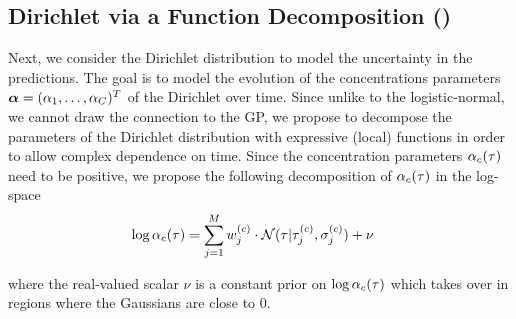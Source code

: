 \subsection{Dirichlet via a Function Decomposition (\DirModel)}
\label{dirichlet}

Next, we consider the Dirichlet distribution to model the uncertainty in the predictions. The goal is to model the evolution of the concentrations parameters $\bm{\alpha}=(\alpha_1, \dots,\alpha_C)^T$ of the Dirichlet over time. 
Since unlike to the logistic-normal, we cannot draw the connection to the GP, we propose  to decompose the parameters of the Dirichlet distribution with expressive (local) functions in order to allow complex dependence on time. 
Since the concentration parameters $\alpha_c(\tau)$  need to be positive, we propose the following decomposition of $\alpha_c(\tau)$ in the log-space
\begin{equation}\label{eq:fct_dec}
\begin{aligned}
\log \alpha_c(\tau) &= \sum_{j=1}^{M} w_j^{(c)} \cdot \mathcal{N}(\tau|\tau_j^{(c)}, \sigma_j^{(c)}) + \nu
\end{aligned}
\end{equation}

where the real-valued scalar $\nu$ is a constant prior on $\log \alpha_c(\tau)$ which takes over in regions where the Gaussians are close to $0$.

